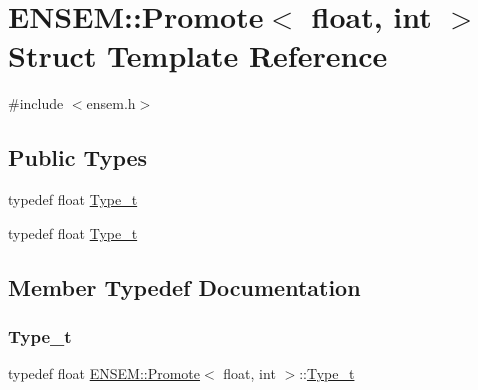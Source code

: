 \hypertarget{structENSEM_1_1Promote_3_01float_00_01int_01_4}{}\section{E\+N\+S\+EM\+:\+:Promote$<$ float, int $>$ Struct Template Reference}
\label{structENSEM_1_1Promote_3_01float_00_01int_01_4}


{\ttfamily \#include $<$ensem.\+h$>$}

\subsection*{Public Types}
\begin{DoxyCompactItemize}
\item 
typedef float \mbox{\hyperlink{structENSEM_1_1Promote_3_01float_00_01int_01_4_ac183cf99d20cafab1e283ee7435667af}{Type\+\_\+t}}
\item 
typedef float \mbox{\hyperlink{structENSEM_1_1Promote_3_01float_00_01int_01_4_ac183cf99d20cafab1e283ee7435667af}{Type\+\_\+t}}
\end{DoxyCompactItemize}


\subsection{Member Typedef Documentation}
\mbox{\label{structENSEM_1_1Promote_3_01float_00_01int_01_4_ac183cf99d20cafab1e283ee7435667af}} 
\subsubsection{\texorpdfstring{Type\_t}{Type\_t}\hspace{0.1cm}{\footnotesize\ttfamily [1/2]}}
{\footnotesize\ttfamily typedef float \mbox{\hyperlink{structENSEM_1_1Promote}{E\+N\+S\+E\+M\+::\+Promote}}$<$ float, int $>$\+::\mbox{\hyperlink{structENSEM_1_1Promote_3_01float_00_01int_01_4_ac183cf99d20cafab1e283ee7435667af}{Type\+\_\+t}}}

\mbox{\label{structENSEM_1_1Promote_3_01float_00_01int_01_4_ac183cf99d20cafab1e283ee7435667af}} 
